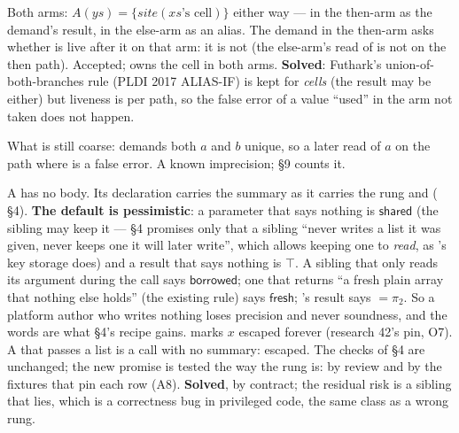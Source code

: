 Both arms: $A(\mathit{ys}) = \{\mathit{site}(\mathit{xs}\text{'s cell})\}$ either way — in the then-arm as the demand's result, in the else-arm as an alias. The demand in the then-arm asks whether  is live after it on that arm: it is not (the else-arm's read of  is not on the then path). Accepted;  owns the cell in both arms. \textbf{Solved}: Futhark's union-of-both-branches rule (PLDI 2017 ALIAS-IF) is kept for \emph{cells} (the result may be either) but liveness is per path, so the false error of a value “used” in the arm not taken does not happen.

What is still coarse:  demands both $a$ and $b$ unique, so a later read of $a$ on the path where  is a false error. A known imprecision; §9 counts it.


A  has no body. Its declaration carries the summary as it carries the rung and  ( §4). \textbf{The default is pessimistic}: a  parameter that says nothing is $\mathsf{shared}$ (the sibling may keep it —  §4 promises only that a sibling “never writes a list it was given, never keeps one it will later write”, which allows keeping one to \emph{read}, as 's key storage does) and a result that says nothing is $\top$. A sibling that only reads its argument during the call says $\mathsf{borrowed}$; one that returns “a fresh plain array that nothing else holds” (the existing rule) says $\mathsf{fresh}$; 's result says $=\pi _{2}$. So a platform author who writes nothing loses precision and never soundness, and the words are what  §4's recipe gains.  marks $x$ escaped forever (research 42's pin, O7). A  that passes a list is a  call with no summary: escaped. The checks of  §4 are unchanged; the new promise is tested the way the rung is: by review and by the  fixtures that pin each row (A8). \textbf{Solved}, by contract; the residual risk is a sibling that lies, which is a correctness bug in privileged code, the same class as a wrong rung.



